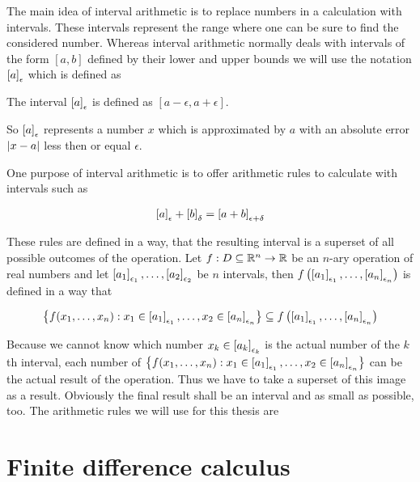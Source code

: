 The main idea of interval arithmetic is to replace numbers in a calculation with intervals. These intervals represent the range where one can be sure to find the considered number. Whereas interval arithmetic normally deals with intervals of the form $[a,b]$ defined by their lower and upper bounds  we will use the notation $\an{a}$ which is defined as 

\begin{definition}
  The interval $\an{a}$ is defined as $[a-\epsilon,a+\epsilon]$.
\end{definition}

So $\an{a}$ represents a number $x$ which is approximated by $a$ with an absolute error $\abs{x-a}$ less then or equal $\epsilon$.

One purpose of interval arithmetic is to offer arithmetic rules to calculate with intervals such as 

\begin{align}
  \an{a}+\an[\delta]{b} = \an[\epsilon+\delta]{a+b}
\end{align}

These rules are defined in a way, that the resulting interval is a superset of all possible outcomes of the operation. Let $f:D\subseteq\R^n\to\R$ be an $n$-ary operation of real numbers and let $\an[\epsilon_1]{a_1},\ldots,\an[\epsilon_2]{a_2}$ be $n$ intervals, then $f\left(\an[\epsilon_1]{a_1},\ldots,\an[\epsilon_n]{a_n}\right)$ is defined in a way that 

\begin{align}
  \left\{f(x_1,\ldots,x_n):x_1\in\an[\epsilon_1]{a_1},\ldots,x_2\in\an[\epsilon_n]{a_n}\right\} \subseteq f\left(\an[\epsilon_1]{a_1},\ldots,\an[\epsilon_n]{a_n}\right)
\end{align}

Because we cannot know which number $x_k \in \an[\epsilon_k]{a_k}$ is the actual number of the $k$th interval, each number of $\left\{f(x_1,\ldots,x_n):x_1\in\an[\epsilon_1]{a_1},\ldots,x_2\in\an[\epsilon_n]{a_n}\right\}$ can be the actual result of the operation. Thus we have to take a superset of this image as a result. Obviously the final result shall be an interval and as small as possible, too. The arithmetic rules we will use for this thesis are 

\begin{theorem}

\end{theorem}

\section{Finite difference calculus}

